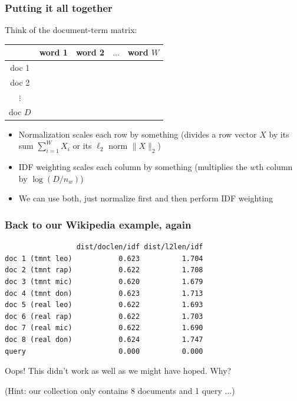 \documentclass[mathserif]{beamer}
\def\red{\color[rgb]{0.8,0,0}}
\begin{document}
\begin{frame}
\frametitle{Putting it all together}
Think of the document-term matrix:

\smallskip
\begin{center}
\begin{tabular}{|c|c|c|c|c|}
\hline
& word 1 & word 2 & $\ldots$ & word $W$ \\
\hline
doc 1 & & & & \\
\hline
doc 2 & & & & \\
\hline
$\vdots$ & & & & \\
\hline
doc $D$ & & & & \\
\hline
\end{tabular}
\end{center}

\smallskip
\begin{itemize}
\item {\red Normalization} scales each row by something
(divides a row vector $X$ by its sum $\sum_{i=1}^W X_i$ 
or its $\ell_2$ norm $\|X\|_2$)
\item {\red IDF weighting} scales each column by something
(multiplies the $w$th column by $\log(D/n_w)$)
\item We can use both, just normalize first and then 
perform IDF weighting
\end{itemize}
\end{frame}

\begin{frame}[fragile]
\frametitle{Back to our Wikipedia example, again}
{\footnotesize
\begin{verbatim}
                 dist/doclen/idf dist/l2len/idf
doc 1 (tmnt leo)           0.623          1.704
doc 2 (tmnt rap)           0.622          1.708
doc 3 (tmnt mic)           0.620          1.679
doc 4 (tmnt don)           0.623          1.713
doc 5 (real leo)           0.622          1.693
doc 6 (real rap)           0.622          1.703
doc 7 (real mic)           0.622          1.690
doc 8 (real don)           0.624          1.747
query                      0.000          0.000
\end{verbatim}}

{\red Oops!} This didn't work as well as we might 
have hoped. Why? 

\bigskip
(Hint: our collection only contains
8 documents and 1 query ...)
\end{frame}
\end{document}
